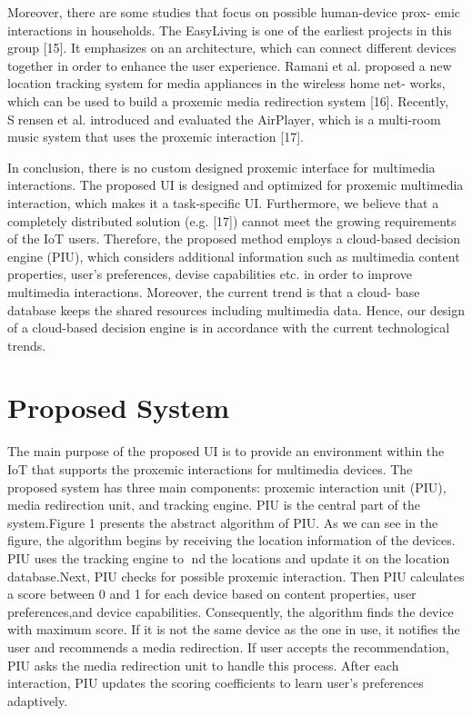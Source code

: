 \documentclass{article}
\begin{document}
Moreover, there are some studies that focus on possible human-device prox-
emic interactions in households. The EasyLiving is one of the earliest projects in this group [15]. It emphasizes on an architecture, which can connect different devices together in order to enhance the user experience. Ramani et al. proposed a new location tracking system for media appliances in the wireless home net- works, which can be used to build a proxemic media redirection system [16]. Recently, Srensen et al. introduced and evaluated the AirPlayer, which is a multi-room music system that uses the proxemic interaction [17].

In conclusion, there is no custom designed proxemic interface for multimedia interactions. The proposed UI is designed and optimized for proxemic multimedia interaction, which makes it a task-specific UI. Furthermore, we believe that a completely distributed solution (e.g. [17]) cannot meet the growing requirements of the IoT users. Therefore, the proposed method employs a cloud-based decision engine (PIU), which considers additional information such as multimedia content properties, user's preferences, devise capabilities etc. in order to improve multimedia interactions. Moreover, the current trend is that a cloud-
base database keeps the shared resources including multimedia data. Hence, our design of a cloud-based decision engine is in accordance with the current technological trends.

\section{Proposed System}
The main purpose of the proposed UI is to provide an environment within the IoT that supports the proxemic interactions for multimedia devices. The proposed system has three main components: proxemic interaction unit (PIU), media redirection unit, and tracking engine. PIU is the central part of the system.Figure 1 presents the abstract algorithm of PIU. As we can see in the figure, the algorithm begins by receiving the location information of the devices. PIU uses the tracking engine to nd the locations and update it on the location database.Next, PIU checks for possible proxemic interaction. Then PIU calculates a score between 0 and 1 for each device based on content properties, user preferences,and device capabilities. Consequently, the algorithm finds the device with maximum score. If it is not the same device as the one in use, it notifies the user and recommends a media redirection. If user accepts the recommendation, PIU asks the media redirection unit to handle this process. After each interaction, PIU updates the scoring coefficients to learn user's preferences adaptively.
\end{document}
